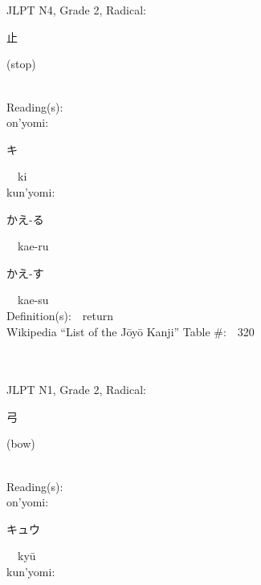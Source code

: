 \begin{multicols}{2}
\ \ \\
{\fontsize{34pt}{40pt}  }\ \ \\  %
{JLPT N4, Grade 2, Radical:\ \ {\begin{CJK}{UTF8}{min} 止 \end{CJK}} (stop) } \\
Reading(s):\ \ \\
{\hspace*{1em}}on'yomi:\ \ \\
{\hspace*{2em}}{\begin{CJK}{UTF8}{min} キ \end{CJK}}\ \ ki\ \ \\
{\hspace*{1em}}kun'yomi:\ \ \\
{\hspace*{2em}}{\begin{CJK}{UTF8}{min} かえ-る \end{CJK}}\ \ kae-ru\ \ \\
{\hspace*{2em}}{\begin{CJK}{UTF8}{min} かえ-す \end{CJK}}\ \ kae-su\ \ \\
Definition(s):\ \ return \\
Wikipedia ``List of the J\=oy\=o Kanji'' Table \#:\ \ 320 \\
\ \ \\
{\fontsize{34pt}{40pt}  }\ \ \\  %
{JLPT N1, Grade 2, Radical:\ \ {\begin{CJK}{UTF8}{min} 弓 \end{CJK}} (bow) } \\
Reading(s):\ \ \\
{\hspace*{1em}}on'yomi:\ \ \\
{\hspace*{2em}}{\begin{CJK}{UTF8}{min} キュウ \end{CJK}}\ \ ky\=u\ \ \\
{\hspace*{1em}}kun'yomi:\ \ \\

\end{multicols}
